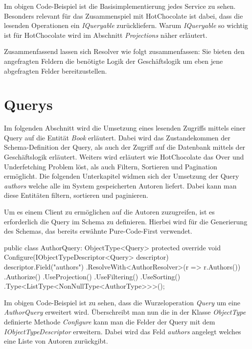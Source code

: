 Im obigen Code-Beispiel ist die Basisimplementierung jedes Service zu sehen.
Besonders relevant für das Zusammenspiel mit HotChocolate ist dabei, dass die lesenden Operationen ein \textit{IQueryable} zurückliefern.
Warum \textit{IQueryable} so wichtig ist für HotChocolate wird im Abschnitt \textit{Projections} näher erläutert.
\newline

Zusammenfassend lassen sich Resolver wie folgt zusammenfassen: Sie bieten den angefragten Feldern die benötigte Logik der Geschäftslogik um eben jene abgefragten Felder bereitzustellen.

\section{Querys}
Im folgenden Abschnitt wird die Umsetzung eines lesenden Zugriffs mittels einer Query auf die Entität \textit{Book} erläutert.
Dabei wird das Zustandekommen der Schema-Definition der Query, als auch der Zugriff auf die Datenbank mittels der Geschäftslogik erläutert.
Weiters wird erläutert wie HotChocolate das Over und Underfetching Problem löst, als auch Filtern, Sortieren und Pagination ermöglicht.
\newline
Die folgenden Unterkapitel widmen sich der Umsetzung der Query \textit{authors} welche alle im System gespeicherten Autoren liefert.
Dabei kann man diese Entitäten filtern, sortieren und paginieren. %

Um es einem Client zu ermöglichen auf die Autoren zuzugreifen, ist es erforderlich die Query im Schema zu definieren.
Hierbei wird für die Generierung des Schemas, das bereits erwähnte Pure-Code-First verwendet.
\newline

\begin{JsCode}
public class AuthorQuery: ObjectType<Query> {
    protected override void Configure(IObjectTypeDescriptor<Query> descriptor) {
        descriptor.Field("authors")
            .ResolveWith<AuthorResolver>(r => r.Authors())
            .Authorize()
            .UseProjection()
            .UseFiltering()
            .UseSorting()
            .Type<ListType<NonNullType<AuthorType>>>();
    }
}
\end{JsCode}

Im obigen Code-Beispiel ist zu sehen, dass die Wurzeloperation \textit{Query} um eine \textit{AuthorQuery} erweitert wird.
Überschreibt man nun die in der Klasse \textit{ObjectType} definierte Methode \textit{Configure} kann man die Felder der Query mit dem \textit{IObjectTypeDescriptor} erweitern.
Dabei wird das Feld \textit{authors} angelegt welches eine Liste von Autoren zurückgibt.

